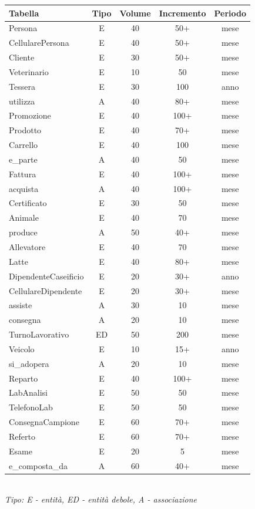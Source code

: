 \documentclass[12pt]{report}
\begin{document}
\begin{center}
 \begin{tabular}{||l c c c c||} 
 \hline
 Tabella & Tipo & Volume & Incremento & Periodo \\ [0.5ex] 
 \hline\hline
    Persona & E & 40 & 50+ & mese \\
    CellularePersona & E & 40 & 50+ & mese \\
    Cliente & E & 30 & 50+ & mese \\
    Veterinario & E & 10 & 50 & mese \\
    Tessera & E & 30 & 100 & anno \\
    utilizza & A & 40 & 80+ & mese \\
    Promozione & E & 40 & 100+ & mese \\
    Prodotto & E & 40 & 70+ & mese \\
    Carrello & E & 40 & 100 & mese \\
    e\_parte & A & 40 & 50 & mese \\
    Fattura & E & 40 & 100+ & mese \\
    acquista & A & 40 & 100+ & mese \\
    Certificato & E & 30 & 50 & mese \\
    Animale & E & 40 & 70 & mese \\
    produce & A & 50 & 40+ & mese \\
    Allevatore & E & 40 & 70 & mese \\
    Latte & E & 40 & 80+ & mese \\
    DipendenteCaseificio & E & 20 & 30+ & anno \\
    CellulareDipendente & E & 20 & 30+ & mese \\
    assiste & A & 30 & 10 & mese\\
    consegna & A & 20 & 10 & mese\\
    TurnoLavorativo & ED & 50 & 200 & mese \\
    Veicolo & E & 10 & 15+ & anno \\
    si\_adopera & A & 20 & 10 & mese \\
    Reparto & E & 40 & 100+ & mese \\
    LabAnalisi & E & 50 & 50 & mese \\
    TelefonoLab & E & 50 & 50 & mese \\
    ConsegnaCampione & E & 60 & 70+ & mese \\
    Referto & E & 60 & 70+ & mese \\
    Esame & E & 20 & 5 & mese \\
    e\_composta\_da & A & 60 & 40+ & mese \\     
 
 \hline
\end{tabular}\\
\textit{Tipo: E - entità, ED - entità debole, A - associazione}
\end{center}
\end{document}
